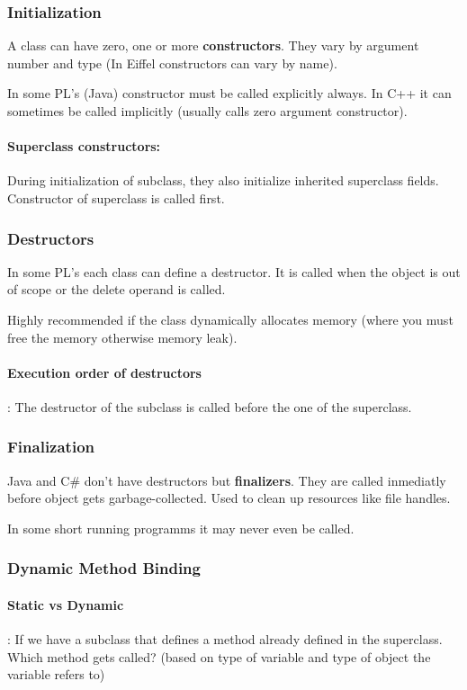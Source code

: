 \documentclass{article}
\begin{document}
\subsubsection{Initialization }
A class can have zero, one or more \textbf{constructors}. They vary by argument number and type (In Eiffel constructors can vary by name).

In some PL's (Java) constructor must be called explicitly always. In C++ it can sometimes be called implicitly (usually calls zero argument constructor).

\paragraph{Superclass constructors: } During initialization of subclass, they also initialize inherited superclass fields. Constructor of superclass is called first.

\subsubsection{Destructors}
In some PL's each class can define a destructor. It is called when the object is out of scope or the delete operand is called.

Highly recommended if the class dynamically allocates memory (where you must free the memory otherwise memory leak).

\paragraph{Execution order of destructors}: The destructor of the subclass is called before the one of the superclass. 

\subsubsection{Finalization}
Java and C\# don't have destructors but \textbf{finalizers}. They are called inmediatly before object gets garbage-collected. Used to clean up resources like file handles. 

In some short running programms it may never even be called.

\subsubsection{Dynamic Method Binding}
\paragraph{Static vs Dynamic}: If we have a subclass that defines a method already defined in the superclass. Which method gets called? (based on type of variable and type of object the variable refers to)
\end{document}

